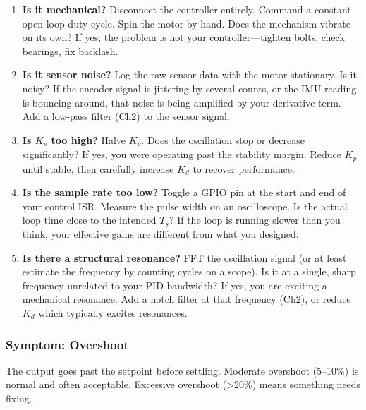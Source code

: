 \begin{enumerate}
    \item \textbf{Is it mechanical?} Disconnect the controller entirely. Command a constant open-loop duty cycle. Spin the motor by hand. Does the mechanism vibrate on its own? If yes, the problem is not your controller---tighten bolts, check bearings, fix backlash.

    \item \textbf{Is it sensor noise?} Log the raw sensor data with the motor stationary. Is it noisy? If the encoder signal is jittering by several counts, or the IMU reading is bouncing around, that noise is being amplified by your derivative term. Add a low-pass filter (Ch2) to the sensor signal.

    \item \textbf{Is $K_p$ too high?} Halve $K_p$. Does the oscillation stop or decrease significantly? If yes, you were operating past the stability margin. Reduce $K_p$ until stable, then carefully increase $K_d$ to recover performance.

    \item \textbf{Is the sample rate too low?} Toggle a GPIO pin at the start and end of your control ISR. Measure the pulse width on an oscilloscope. Is the actual loop time close to the intended $T_s$? If the loop is running slower than you think, your effective gains are different from what you designed.

    \item \textbf{Is there a structural resonance?} FFT the oscillation signal (or at least estimate the frequency by counting cycles on a scope). Is it at a single, sharp frequency unrelated to your PID bandwidth? If yes, you are exciting a mechanical resonance. Add a notch filter at that frequency (Ch2), or reduce $K_d$ which typically excites resonances.
\end{enumerate}

\subsubsection{Symptom: Overshoot}

The output goes past the setpoint before settling. Moderate overshoot (5--10\%) is normal and often acceptable. Excessive overshoot (>20\%) means something needs fixing.

